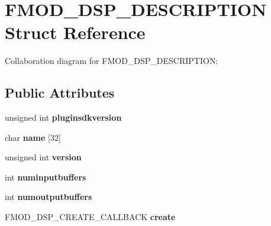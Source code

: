 \hypertarget{struct_f_m_o_d___d_s_p___d_e_s_c_r_i_p_t_i_o_n}{\section{F\+M\+O\+D\+\_\+\+D\+S\+P\+\_\+\+D\+E\+S\+C\+R\+I\+P\+T\+I\+O\+N Struct Reference}
\label{struct_f_m_o_d___d_s_p___d_e_s_c_r_i_p_t_i_o_n}
}


Collaboration diagram for F\+M\+O\+D\+\_\+\+D\+S\+P\+\_\+\+D\+E\+S\+C\+R\+I\+P\+T\+I\+O\+N\+:
\subsection*{Public Attributes}
\begin{DoxyCompactItemize}
\item 
\hypertarget{struct_f_m_o_d___d_s_p___d_e_s_c_r_i_p_t_i_o_n_a1aa77090637614c1e9f185c11cceb242}{unsigned int {\bfseries pluginsdkversion}}\label{struct_f_m_o_d___d_s_p___d_e_s_c_r_i_p_t_i_o_n_a1aa77090637614c1e9f185c11cceb242}

\item 
\hypertarget{struct_f_m_o_d___d_s_p___d_e_s_c_r_i_p_t_i_o_n_a1af8c6818751aaec3ed93bb8890073b8}{char {\bfseries name} \mbox{[}32\mbox{]}}\label{struct_f_m_o_d___d_s_p___d_e_s_c_r_i_p_t_i_o_n_a1af8c6818751aaec3ed93bb8890073b8}

\item 
\hypertarget{struct_f_m_o_d___d_s_p___d_e_s_c_r_i_p_t_i_o_n_a2b39be891bd32c184883a673348bd29a}{unsigned int {\bfseries version}}\label{struct_f_m_o_d___d_s_p___d_e_s_c_r_i_p_t_i_o_n_a2b39be891bd32c184883a673348bd29a}

\item 
\hypertarget{struct_f_m_o_d___d_s_p___d_e_s_c_r_i_p_t_i_o_n_aa86c6fe14d379c7bd28c72583ff552d5}{int {\bfseries numinputbuffers}}\label{struct_f_m_o_d___d_s_p___d_e_s_c_r_i_p_t_i_o_n_aa86c6fe14d379c7bd28c72583ff552d5}

\item 
\hypertarget{struct_f_m_o_d___d_s_p___d_e_s_c_r_i_p_t_i_o_n_a7704565049cc02d55341a4050326101d}{int {\bfseries numoutputbuffers}}\label{struct_f_m_o_d___d_s_p___d_e_s_c_r_i_p_t_i_o_n_a7704565049cc02d55341a4050326101d}

\item 
\hypertarget{struct_f_m_o_d___d_s_p___d_e_s_c_r_i_p_t_i_o_n_a031561988b3fc12aa20608e9215f2a5f}{F\+M\+O\+D\+\_\+\+D\+S\+P\+\_\+\+C\+R\+E\+A\+T\+E\+\_\+\+C\+A\+L\+L\+B\+A\+C\+K {\bfseries create}}\label{struct_f_m_o_d___d_s_p___d_e_s_c_r_i_p_t_i_o_n_a031561988b3fc12aa20608e9215f2a5f}


\end{DoxyCompactItemize}
